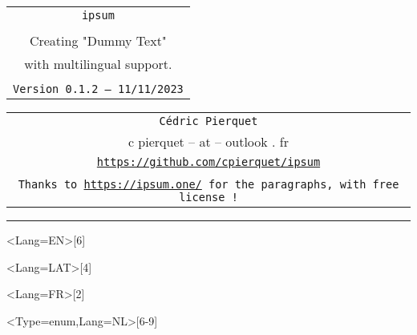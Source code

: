 \documentclass[11pt,a4paper]{ltxdoc}
\def\TPversion{0.1.2}
\def\TPdate{11/11/2023}
\begin{document}
\pagestyle{fancy}

\thispagestyle{empty}

\begin{center}
	\begin{minipage}{0.88\linewidth}
	\begin{tcolorbox}[colframe=yellow,colback=yellow!15]
		\begin{center}
			\begin{tabular}{c}
				{\Huge \texttt{ipsum}}\\
				\\
				{\LARGE Creating "Dummy Text"} \\
				{\LARGE with multilingual support.} \\
				\\
				{\small \texttt{Version \TPversion{} -- \TPdate}}
		\end{tabular}
		\end{center}
	\end{tcolorbox}
\end{minipage}
\end{center}

\begin{center}
	\begin{tabular}{c}
	\texttt{Cédric Pierquet}\\
	{\ttfamily c pierquet -- at -- outlook . fr}\\
	\texttt{\url{https://github.com/cpierquet/ipsum}} \\
	\\
	\texttt{Thanks to \url{https://ipsum.one/} for the paragraphs, with free license !}
\end{tabular}
\end{center}

\hrule

\vfill

\begin{tcolorbox}[colframe=lightgray,colback=lightgray!5]
\ipsum<Lang=EN>[6]
\end{tcolorbox}

\begin{tcolorbox}[colframe=lightgray,colback=lightgray!5]
\ipsum<Lang=LAT>[4]
\end{tcolorbox}

\begin{tcolorbox}[colframe=lightgray,colback=lightgray!5]
\ipsum<Lang=FR>[2]
\end{tcolorbox}

\begin{tcolorbox}[colframe=lightgray,colback=lightgray!5]
\ipsum<Type=enum,Lang=NL>[6-9]
\end{tcolorbox}
\end{document}
